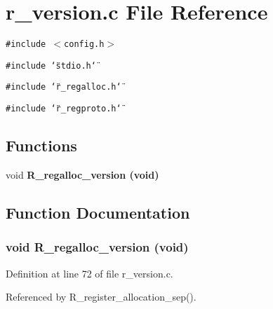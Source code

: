 \section{r\_\-version.c File Reference}
\label{r__version_8c}
{\tt \#include $<$config.h$>$}\par
{\tt \#include \char`\"{}stdio.h\char`\"{}}\par
{\tt \#include \char`\"{}r\_\-regalloc.h\char`\"{}}\par
{\tt \#include \char`\"{}r\_\-regproto.h\char`\"{}}\par
\subsection*{Functions}
\begin{CompactItemize}
\item 
void \bf{R\_\-regalloc\_\-version} (void)
\end{CompactItemize}


\subsection{Function Documentation}
\subsubsection{\setlength{\rightskip}{0pt plus 5cm}void R\_\-regalloc\_\-version (void)}\label{r__version_8c_e0605262f9cb355730d650fdb72860a5}




Definition at line 72 of file r\_\-version.c.

Referenced by R\_\-register\_\-allocation\_\-sep().